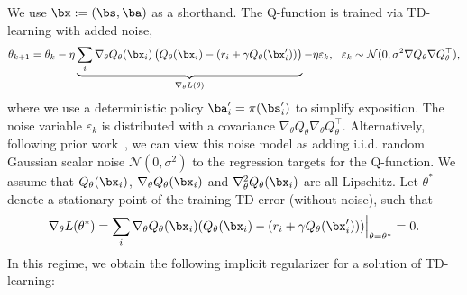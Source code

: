 We use $\bx := (\bs, \ba)$ as a shorthand. The Q-function is trained via TD-learning with added noise,  
\begin{equation}
     \theta_{k+1} = \theta_k - \eta \underbrace{\sum_i \nabla_\theta Q_\theta(\bx_i) \left(Q_\theta(\bx_i) - (r_i + \gamma Q_\theta(\bx'_i))\right)}_{\nabla_\theta L(\theta)} - \eta \varepsilon_k, ~~ \varepsilon_k \sim \mathcal{N}(0, \sigma^2 \nabla Q_\theta \nabla Q_\theta^\top),  
\label{eq:td_update}
\end{equation}
where we use a deterministic policy $\ba'_i = \pi(\bs'_i)$ to simplify exposition. The noise variable $\varepsilon_k$ is distributed with a covariance $\nabla_\theta Q_\theta \nabla_\theta Q_\theta^\top$. Alternatively, following prior work~\citep{blanc2020implicit}, we can view this noise model as adding i.i.d. random Gaussian scalar noise $\mathcal{N}(0, \sigma^2)$ to the regression targets for the Q-function.  We assume that $Q_\theta(\bx_i)$,  $\nabla_\theta Q_\theta(\bx_i)$ and $\nabla^2_\theta Q_\theta(\bx_i)$ are all Lipschitz. %
Let $\theta^*$ denote a stationary point of the training TD error (without noise), such that
\begin{equation}
    \nabla_\theta L(\theta^*) = \sum_i \nabla_\theta Q_\theta(\bx_i) (Q_\theta(\bx_i) - (r_i + \gamma Q_\theta(\bx'_i))) \Big\vert_{\theta = \theta^*} = 0.
\end{equation}
In this regime, we obtain the following implicit regularizer for a solution of TD-learning: 

